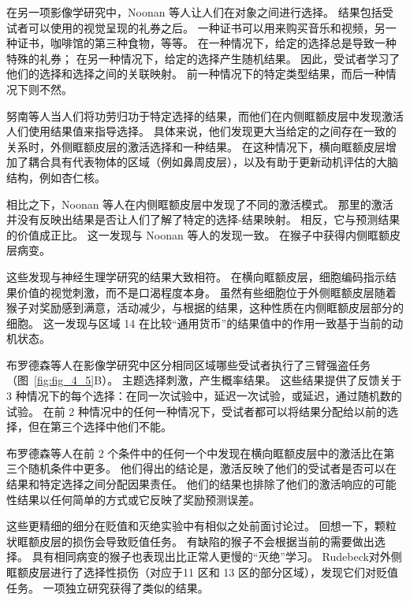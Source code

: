 在另一项影像学研究中，Noonan 等人\cite{noonan2011distinct}让人们在对象之间进行选择。
结果包括受试者可以使用的视觉呈现的礼券之后。
一种证书可以用来购买音乐和视频，另一种证书，咖啡馆的第三种食物，等等。
在一种情况下，给定的选择总是导致一种特殊的礼券；
在另一种情况下，给定的选择产生随机结果。
因此，受试者学习了他们的选择和选择之间的关联映射。
前一种情况下的特定类型结果，而后一种情况下则不然。\par


努南等人当人们将功劳归功于特定选择的结果，而他们在内侧眶额皮层中发现激活人们使用结果值来指导选择。
具体来说，他们发现更大当给定的之间存在一致的关系时，外侧眶额皮层的激活选择和一种结果。
在这种情况下，横向眶额皮层增加了耦合具有代表物体的区域（例如鼻周皮层），以及有助于更新动机评估的大脑结构，例如杏仁核。\par


相比之下，Noonan 等人在内侧眶额皮层中发现了不同的激活模式。
那里的激活并没有反映出结果是否让人们了解了特定的选择-结果映射。
相反，它与预测结果的价值成正比。
这一发现与 Noonan 等人的发现一致\cite{noonan2010separate}。
在猴子中获得内侧眶额皮层病变。\par


这些发现与神经生理学研究的结果大致相符。
在横向眶额皮层，细胞编码指示结果价值的视觉刺激，而不是口渴程度本身\cite{bouret2010ventromedial}。
虽然有些细胞位于外侧眶额皮层随着猴子对奖励感到满意，活动减少，与根据\cite{critchley1996hunger}的结果，这种性质在内侧眶额皮层部分的细胞\cite{bouret2010ventromedial}。
这一发现与区域 14 在比较“通用货币”的结果值中的作用一致基于当前的动机状态。\par


布罗德森等人\cite{brodersenorbitofrontal}在影像学研究中区分相同区域哪些受试者执行了三臂强盗任务（图~\ref{fig:fig_4_5}B）。
主题选择刺激，产生概率结果。
这些结果提供了反馈关于 3 种情况下的每个选择：在同一次试验中，延迟一次试验，或延迟，通过随机数的试验。
在前 2 种情况中的任何一种情况下，受试者都可以将结果分配给以前的选择，但在第三个选择中他们不能。\par


布罗德森等人在前 2 个条件中的任何一个中发现在横向眶额皮层中的激活比在第三个随机条件中更多。
他们得出的结论是，激活反映了他们的受试者是否可以在结果和特定选择之间分配因果责任。
他们的结果也排除了他们的激活响应的可能性结果以任何简单的方式或它反映了奖励预测误差。\par


这些更精细的细分在贬值和灭绝实验中有相似之处前面讨论过。
回想一下，颗粒状眶额皮层的损伤会导致贬值任务。
有缺陷的猴子不会根据当前的需要做出选择。
具有相同病变的猴子也表现出比正常人更慢的“灭绝”学习。
Rudebeck\cite{rudebeck2011dissociable}对外侧眶额皮层进行了选择性损伤（对应于11 区和 13 区的部分区域），发现它们对贬值任务。
一项独立研究获得了类似的结果\cite{machado2007effects}。\par


